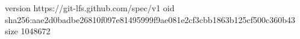 version https://git-lfs.github.com/spec/v1
oid sha256:aae2d0badbe26810f097e81495999f9ae081e2cf3cbb1863b125cf500c360b43
size 1048672
